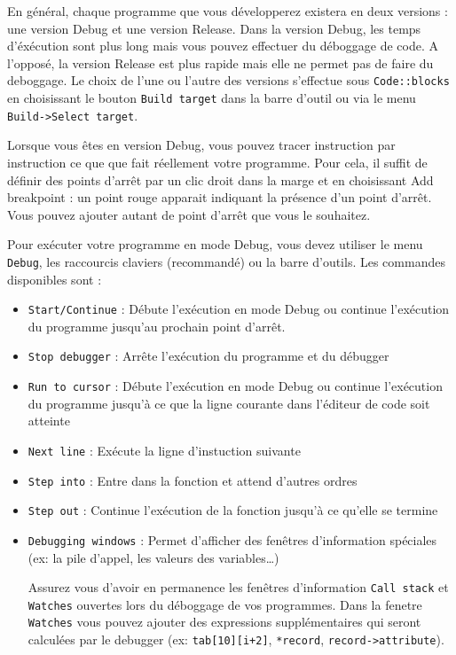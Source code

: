 En général, chaque programme que vous développerez existera en deux versions : une version Debug et une version Release. Dans la version Debug, les temps d'éxécution sont plus long mais vous pouvez effectuer du déboggage de code. A l'opposé, la version Release est plus rapide mais elle ne permet pas de faire du deboggage. Le choix de l'une ou l'autre des versions s'effectue sous \verb-Code::blocks- en choisissant le bouton \verb-Build target- dans la barre d'outil ou via le menu \verb'Build->Select target'. 

Lorsque vous êtes en version Debug, vous pouvez tracer instruction par instruction ce que que fait réellement votre programme. Pour cela, il suffit de définir des points d'arrêt par un clic droit dans la marge et en choisissant \og{}Add breakpoint\fg{} : un point rouge apparait indiquant la présence d'un point d'arrêt. Vous pouvez ajouter autant de point d'arrêt que vous le souhaitez. 

Pour exécuter votre programme en mode Debug, vous devez utiliser le menu \verb-Debug-, les raccourcis claviers (recommandé) ou la barre d'outils.
Les commandes disponibles sont :
\begin{itemize}
  \item \verb-Start/Continue- : Débute l'exécution en mode Debug ou continue l'exécution du programme jusqu'au prochain point d'arrêt.
  \item \verb-Stop debugger- : Arrête l'exécution du programme et du débugger
  \item \verb-Run to cursor- : Débute l'exécution en mode Debug ou continue l'exécution du programme jusqu'à ce que la ligne courante dans l'éditeur de code soit atteinte
  \item \verb-Next line- : Exécute la ligne d'instuction suivante
  \item \verb-Step into- : Entre dans la fonction et attend d'autres ordres
  \item \verb-Step out- : Continue l'exécution de la fonction jusqu'à ce qu'elle se termine
  \item \verb-Debugging windows- : Permet d'afficher des fenêtres d'information spéciales (ex: la pile d'appel, les valeurs des variables\ldots)
\begin{tipsandhints}
Assurez vous d'avoir en permanence les fenêtres d'information \verb-Call stack- et \verb-Watches- ouvertes lors du déboggage de vos programmes. Dans la fenetre \verb-Watches- vous pouvez ajouter des expressions supplémentaires qui seront calculées par le debugger (ex: \verb-tab[10][i+2]-, \verb-*record-, \verb'record->attribute').
\end{tipsandhints}
\end{itemize}

